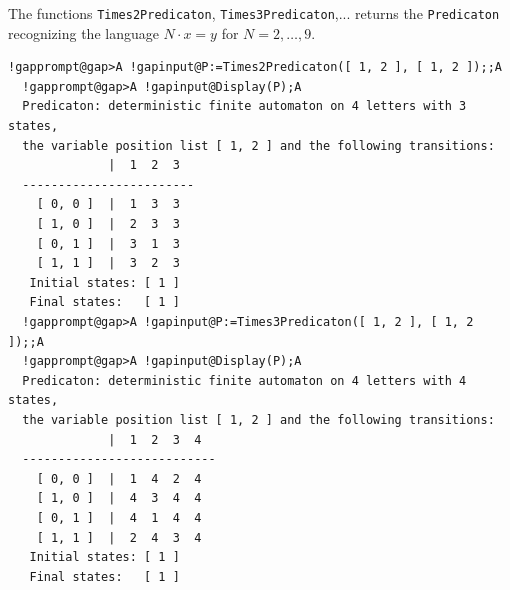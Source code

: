 \documentclass[a4paper,11pt]{report}
\begin{document}
{{{ The functions \texttt{Times2Predicaton}, \texttt{Times3Predicaton},... returns the \texttt{Predicaton} recognizing the language $N \cdot x=y$ for $N=2,\ldots,9$. 
\begin{Verbatim}[commandchars=!@A,fontsize=\small,frame=single,label=Example]
  !gapprompt@gap>A !gapinput@P:=Times2Predicaton([ 1, 2 ], [ 1, 2 ]);;A
  !gapprompt@gap>A !gapinput@Display(P);A
  Predicaton: deterministic finite automaton on 4 letters with 3 states, 
  the variable position list [ 1, 2 ] and the following transitions:
              |  1  2  3  
  ------------------------
    [ 0, 0 ]  |  1  3  3  
    [ 1, 0 ]  |  2  3  3  
    [ 0, 1 ]  |  3  1  3  
    [ 1, 1 ]  |  3  2  3  
   Initial states: [ 1 ]
   Final states:   [ 1 ]
  !gapprompt@gap>A !gapinput@P:=Times3Predicaton([ 1, 2 ], [ 1, 2 ]);;A
  !gapprompt@gap>A !gapinput@Display(P);A
  Predicaton: deterministic finite automaton on 4 letters with 4 states, 
  the variable position list [ 1, 2 ] and the following transitions:
              |  1  2  3  4  
  ---------------------------
    [ 0, 0 ]  |  1  4  2  4  
    [ 1, 0 ]  |  4  3  4  4  
    [ 0, 1 ]  |  4  1  4  4  
    [ 1, 1 ]  |  2  4  3  4  
   Initial states: [ 1 ]
   Final states:   [ 1 ]
\end{Verbatim}
 }

 }

 }

 
\end{document}
